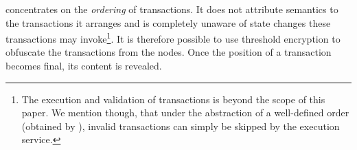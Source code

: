 \name concentrates on the \emph{ordering} of transactions. It does not attribute semantics to the transactions it arranges and is completely unaware of state changes these transactions may invoke\footnote{The execution and validation of transactions is beyond the scope of this paper. We mention though, that under the abstraction of a well-defined order (obtained by \nameNS), invalid transactions can simply be skipped by the execution service.}. It is therefore possible to use threshold encryption to obfuscate the transactions from the nodes. Once the position of a transaction becomes final, its content is revealed.  


